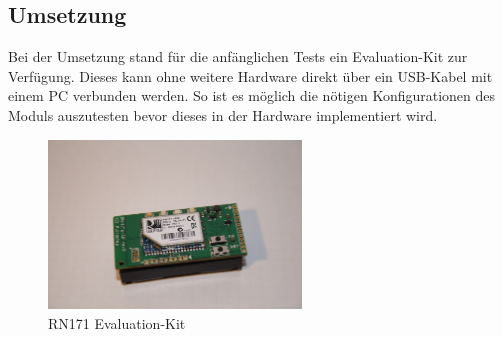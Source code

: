   \subsection{Umsetzung}
  Bei der Umsetzung stand für die anfänglichen Tests ein Evaluation-Kit zur Verfügung. Dieses kann ohne weitere Hardware direkt über ein USB-Kabel mit einem PC verbunden werden.
  So ist es möglich die nötigen Konfigurationen des Moduls auszutesten bevor dieses in der Hardware implementiert wird.

  \begin{figure}[H]
    \begin{centering}
      \includegraphics[width = 0.6\textwidth]{Bilder/RN171_EK}
    \par\end{centering}
    \caption[RN171 Evaluation-Kit]{RN171 Evaluation-Kit\cite{RN171_EK_source}}
    \label{RN171_EK}
  \end{figure}

